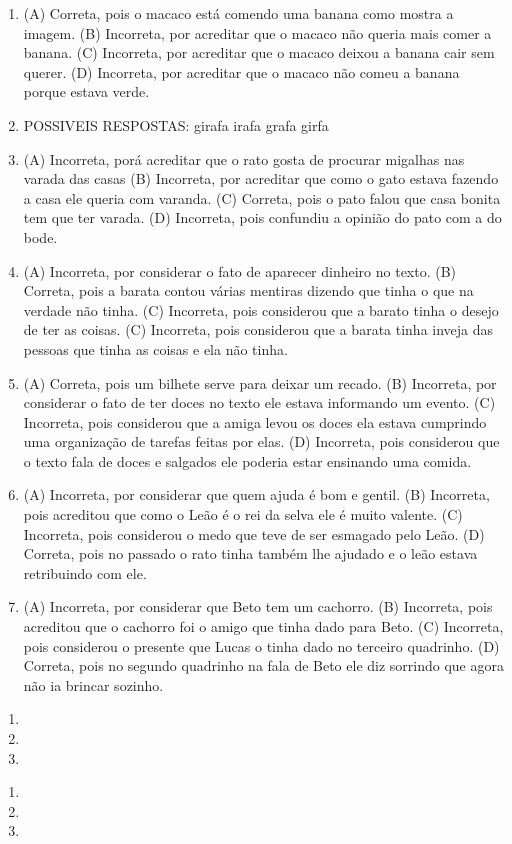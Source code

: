 \begin{enumerate}
\item
(A) Correta, pois o macaco está comendo uma banana como mostra a imagem.
(B) Incorreta, por acreditar que o macaco não queria mais comer a banana.
(C) Incorreta, por acreditar que o macaco deixou a banana cair sem querer.
(D) Incorreta, por acreditar que o macaco não comeu a banana porque estava verde.

\item
POSSIVEIS RESPOSTAS:
girafa
irafa
grafa
girfa

\item
(A) Incorreta, porá acreditar que o rato gosta de procurar migalhas nas
varada das casas
(B) Incorreta, por acreditar que como o gato estava fazendo a casa ele
queria com varanda.
(C) Correta, pois o pato falou que casa bonita tem que ter varada.
(D) Incorreta, pois confundiu a opinião do pato com a do bode.

\item
(A) Incorreta, por considerar o fato de aparecer dinheiro no texto.
(B) Correta, pois a barata contou várias mentiras dizendo que tinha o
que na verdade não tinha.
(C) Incorreta, pois considerou que a barato tinha o desejo de ter as
coisas.
(C) Incorreta, pois considerou que a barata tinha inveja das pessoas que
tinha as coisas e ela não tinha.

\item
(A) Correta, pois um bilhete serve para deixar um recado.
(B) Incorreta, por considerar o fato de ter doces no texto ele estava
informando um evento.
(C) Incorreta, pois considerou que a amiga levou os doces ela estava
cumprindo uma organização de tarefas feitas por elas.
(D) Incorreta, pois considerou que o texto fala de doces e salgados ele
poderia estar ensinando uma
comida.

\item
(A) Incorreta, por considerar que quem ajuda é bom e gentil.
(B) Incorreta, pois acreditou que como o Leão é o rei da selva ele é
muito valente.
(C) Incorreta, pois considerou o medo que teve de ser esmagado pelo
Leão.
(D) Correta, pois no passado o rato tinha também lhe ajudado e o leão
estava retribuindo com ele.

\item
(A) Incorreta, por considerar que Beto tem um cachorro.
(B) Incorreta, pois acreditou que o cachorro foi o amigo que tinha dado
para Beto.
(C) Incorreta, pois considerou o presente que Lucas o tinha dado no
terceiro quadrinho.
(D) Correta, pois no segundo quadrinho na fala de Beto ele diz sorrindo
que agora não ia brincar sozinho.
\end{enumerate}


\begin{enumerate}
\item

\item

\item
\end{enumerate}


\begin{enumerate}
\item

\item

\item
\end{enumerate}